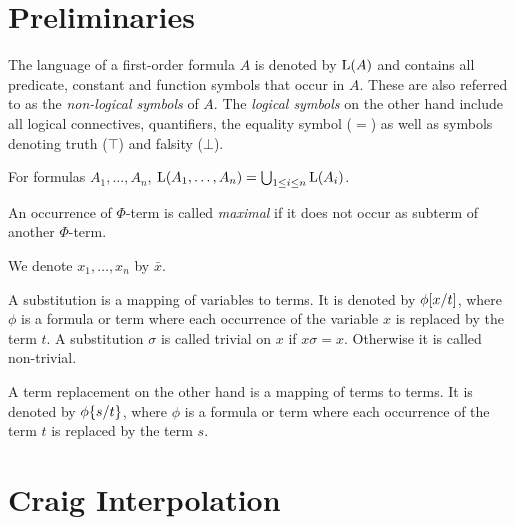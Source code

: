 \section{Preliminaries}

The language of a first-order formula $A$ is denoted by $\operatorname{L}(A)$ and contains all predicate, constant and function symbols that occur in $A$.
These are also referred to as the \emph{\mbox{non-logical} symbols} of $A$.
The \emph{logical symbols} on the other hand include all logical connectives, quantifiers, the equality symbol ($=$) as well as symbols denoting truth ($\top$) and falsity ($\bot$).

For formulas $A_1, \ldots, A_n$, $\operatorname{L}(A_1, \ldots, A_n) = \bigcup_{1\leq i \leq n} \operatorname{L}(A_i)$.

An occurrence of $\Phi$-term is called \emph{maximal} if it does not occur as subterm of another $\Phi$-term.

We denote $x_1, \ldots, x_n$ by $\bar x$.

A substitution is a mapping of variables to terms. It is denoted by $\phi[x/t]$, where $\phi$ is a formula or term where each occurrence of the variable $x$ is replaced by the term $t$.
A substitution $\sigma$ is called trivial on $x$ if $x\sigma = x$. Otherwise it is called non-trivial.

A term replacement on the other hand is a mapping of terms to terms. It is denoted by $\phi\{s/t\}$, where $\phi$ is a formula or term where each occurrence of the term $t$ is replaced by the term $s$.

\section{Craig Interpolation}


